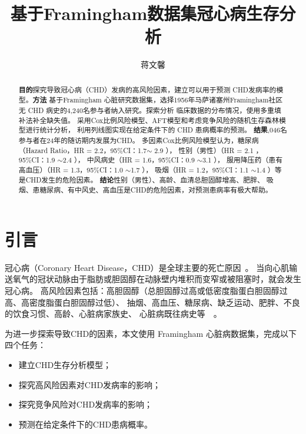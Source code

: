 \documentclass[lang=cn,11pt,a4paper,cite=super,AutoFakeBold]{elegantpaper}
\title{基于Framingham数据集冠心病生存分析}
\author{蒋文馨 \quad 16342067 \quad
   \email{jiangwx7@mail2.sysu.edu.cn}}
\institute{中山大学数学学院17级统计学}
\date{\zhtoday}
\begin{document}
\maketitle
\thispagestyle{empty}
\begin{abstract}
   \textbf{目的}\quad 探究导致冠心病（CHD）发病的高风险因素，建立可以用于预测
   CHD发病率的模型。\textbf{方法}\quad
   基于Framingham 心脏研究数据集，选择1956年马萨诸塞州Framingham社区
   无 CHD 病史的4,240名参与者纳入研究。探索分析
   临床数据的分布情况，使用多重填补法补全缺失值。
   采用Cox比例风险模型、AFT模型和考虑竞争风险的随机生存森林模型进行统计分析，
   利用列线图实现在给定条件下的 CHD 患病概率的预测。
   \textbf{结果},046名参与者在24年的随访期内发展为CHD。
   多因素Cox比例风险模型认为，糖尿病（Hazard Ratio，HR  = 2.2，95\%CI：1.7$ \sim$ 2.9 ），
   性别（男性）（HR  = 2.1 ，95\%CI：1.9 $\sim$2.4 ），
   中风病史（HR  = 1.6，95\%CI：0.9 $\sim$3.1 ），
   服用降压药（患有高血压）（HR  = 1.3，95\%CI：1.0 $\sim$1.7 ），
   吸烟（HR  = 1.2，95\%CI：1.1 $\sim$1.4 ）等是CHD发生的危险因素。
   \textbf{结论}\quad 性别（男性）、高龄、血清总胆固醇增高、肥胖、
   吸烟、患糖尿病、有中风史、高血压是CHD的危险因素，对预测患病率有极大帮助。

\end{abstract}
\setcounter{tocdepth}{1}
\tableofcontents
\thispagestyle{empty}
\newpage

\setcounter{page}{1}
\setcounter{section}{-1}
\section{引言}
冠心病（Coronary Heart Disease，CHD）是全球主要的死亡原因~\cite{firstblood}。
当向心肌输送氧气的冠状动脉由于脂肪或胆固醇在动脉壁内堆积而变窄或被阻塞时，就会发生冠心病。
高风险因素包括：高胆固醇（总胆固醇过高或低密度脂蛋白胆固醇过高、高密度脂蛋白胆固醇过低）、
抽烟、高血压、糖尿病、缺乏运动、肥胖、不良的饮食习惯、高龄、心脏病家族史、
心脏病既往病史等~\cite{2blood}~\cite{3blood}。

为进一步探索导致CHD的因素，本文使用 Framingham 心脏病数据集，完成以下四个任务：
\begin{itemize}
   \item 建立CHD生存分析模型；
   \item 探究高风险因素对CHD发病率的影响；
   \item 探究竞争风险对CHD发病率的影响；
   \item 预测在给定条件下的CHD患病概率。
\end{itemize}
\end{document}
